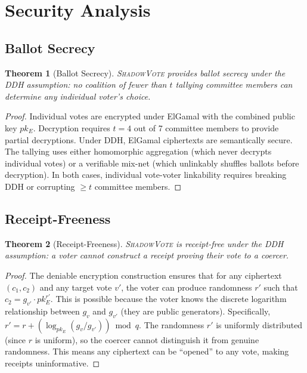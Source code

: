 \documentclass[11pt,a4paper]{article}
\newcommand{\shadow}{\textsc{ShadowVote}\xspace}
\newtheorem{theorem}{Theorem}
\begin{document}
\section{Security Analysis}

\subsection{Ballot Secrecy}

\begin{theorem}[Ballot Secrecy]
\shadow provides ballot secrecy under the DDH assumption: no coalition of fewer than $t$ tallying committee members can determine any individual voter's choice.
\end{theorem}

\begin{proof}
Individual votes are encrypted under ElGamal with the combined public key $pk_E$. Decryption requires $t = 4$ out of 7 committee members to provide partial decryptions. Under DDH, ElGamal ciphertexts are semantically secure. The tallying uses either homomorphic aggregation (which never decrypts individual votes) or a verifiable mix-net (which unlinkably shuffles ballots before decryption). In both cases, individual vote-voter linkability requires breaking DDH or corrupting $\geq t$ committee members.
\end{proof}

\subsection{Receipt-Freeness}

\begin{theorem}[Receipt-Freeness]
\shadow is receipt-free under the DDH assumption: a voter cannot construct a receipt proving their vote to a coercer.
\end{theorem}

\begin{proof}
The deniable encryption construction ensures that for any ciphertext $(c_1, c_2)$ and any target vote $v'$, the voter can produce randomness $r'$ such that $c_2 = g_{v'} \cdot pk_E^{r'}$. This is possible because the voter knows the discrete logarithm relationship between $g_v$ and $g_{v'}$ (they are public generators). Specifically, $r' = r + (\log_{pk_E}(g_v / g_{v'})) \bmod q$. The randomness $r'$ is uniformly distributed (since $r$ is uniform), so the coercer cannot distinguish it from genuine randomness. This means any ciphertext can be ``opened'' to any vote, making receipts uninformative.
\end{proof}
\end{document}
